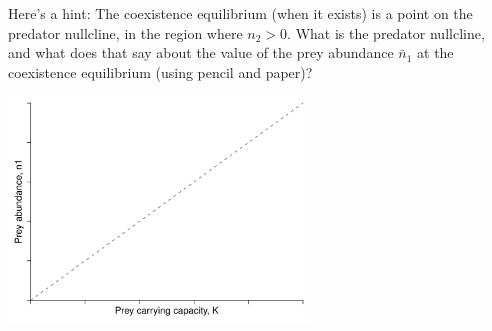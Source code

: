 \documentclass [11pt]{article}
\begin{document}
Here's a hint: The coexistence equilibrium (when it exists) is a point on the predator nullcline, in the region where $n_2 > 0$. 
What is the predator nullcline, and what does that say about the value of the prey abundance $\bar{n}_1$ at 
the coexistence equilibrium (using pencil and paper)? 

\centerline{\includegraphics[width=0.6\textwidth]{RMbifur.pdf}}
\end{document}
